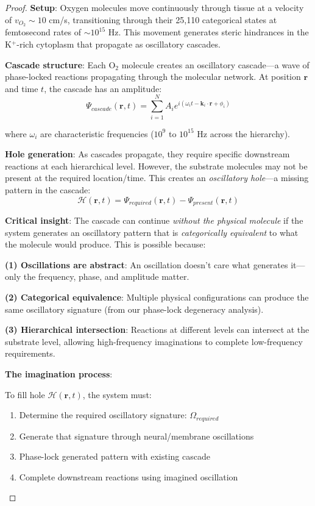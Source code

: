 \documentclass[11pt,a4paper]{article}
\begin{document}
\begin{proof}
\textbf{Setup}: Oxygen molecules move continuously through tissue at a velocity of $v_{O_2} \sim 10$ cm/s, transitioning through their 25,110 categorical states at femtosecond rates of $\sim 10^{15}$ Hz. This movement generates steric hindrances in the K$^+$-rich cytoplasm that propagate as oscillatory cascades.

\textbf{Cascade structure}: Each O$_2$ molecule creates an oscillatory cascade—a wave of phase-locked reactions propagating through the molecular network. At position $\mathbf{r}$ and time $t$, the cascade has an amplitude:
\begin{equation}
\Psi_{cascade}(\mathbf{r}, t) = \sum_{i=1}^{N} A_i e^{i(\omega_i t - \mathbf{k}_i \cdot \mathbf{r} + \phi_i)}
\end{equation}

where $\omega_i$ are characteristic frequencies ($10^{9}$ to $10^{15}$ Hz across the hierarchy).

\textbf{Hole generation}: As cascades propagate, they require specific downstream reactions at each hierarchical level. However, the substrate molecules may not be present at the required location/time. This creates an \textit{oscillatory hole}—a missing pattern in the cascade:
\begin{equation}
\mathcal{H}(\mathbf{r}, t) = \Psi_{required}(\mathbf{r}, t) - \Psi_{present}(\mathbf{r}, t)
\end{equation}

\textbf{Critical insight}: The cascade can continue \textit{without the physical molecule} if the system generates an oscillatory pattern that is \textit{categorically equivalent} to what the molecule would produce. This is possible because:

\textbf{(1) Oscillations are abstract}: An oscillation doesn't care what generates it—only the frequency, phase, and amplitude matter.

\textbf{(2) Categorical equivalence}: Multiple physical configurations can produce the same oscillatory signature (from our phase-lock degeneracy analysis).

\textbf{(3) Hierarchical intersection}: Reactions at different levels can intersect at the substrate level, allowing high-frequency imaginations to complete low-frequency requirements.

\textbf{The imagination process}:

To fill hole $\mathcal{H}(\mathbf{r}, t)$, the system must:
\begin{enumerate}
\item Determine the required oscillatory signature: $\Omega_{required}$
\item Generate that signature through neural/membrane oscillations
\item Phase-lock generated pattern with existing cascade
\item Complete downstream reactions using imagined oscillation
\end{enumerate}


\end{proof}
\end{document}
